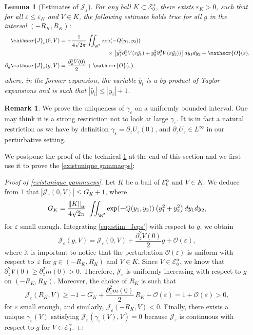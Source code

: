 \documentclass[JEP,XML,SOM,Unicode]{cedram}
\let\mathcal\mathscr
\newcommand{\cO}{\mathcal{O}}
\theoremstyle{plain}
\newtheorem{lem}[thm]{Lemma}
\theoremstyle{definition}
\newtheorem{remark}[thm]{Remark}
\newcommand{\Je}{\mathcal{J}_\eps}
\let\eps\varepsilon
\newcommand{\abs}[1]{\left\lvert#1\right\rvert}
\newcommand{\nalph}[1]{\left\lVert#1\right\rVert_\alpha}
\newcommand{\Eaz}{\mathcal{E}^\alpha_0}
\newcommand{\RK}{R_K}
\newcommand{\GK}{G_K}
\begin{document}
\begin{lem}[Estimates of $\Je$]\label{estimate Jeps}
For any ball $K \subset \Eaz$, there exists $\eps_K>0$, such that for all $\eps \leq \eps_K$ and $V \in K$, the following estimate holds true for all $g$ in the interval $(-\RK, \RK)$:
\begin{align}
\label{eq:estim_Jeps}
\Je(0,V) & = - \dfrac{1}{4 \sqrt{2}\pi} \iint _{\R^2} \exp(-Q (y_1,y_2))\\
&\hspace*{3cm}\times \left[ y_1^2 \partial_z^3 V(\eps \tilde{y_1}) + y_2^2 \partial_z^3 V(\eps \tilde{y_2})) \right] dy_1dy_2 + \cO(\eps),\notag \\
\label{eq:estim_Jeps'} \partial_g \Je(g,V)& =\dfrac{\partial^2_z V(0)}{2} + \cO(\eps),
\end{align}
where, in the former expansion, the variable $\tilde{y_i}$ is a by-product of Taylor expansions and is such that $\abs{\tilde{y_i}} \leq \abs{ y_i}+1$.
\end{lem}

\begin{remark}
We prove the uniqueness of $\gamma_\eps$ on a uniformly bounded interval. One may think it is a strong restriction not to look at large $\gamma_\eps$. It is in fact a natural restriction as we have by definition $\gamma_\eps = \partial_zU_\eps(0)$, and $\partial_z U_\eps \in L^\infty$ in our perturbative setting.
\end{remark}
We postpone the proof of the technical \cref{estimate Jeps} at the end of this section and we first use it to prove the \cref{existunique gammaeps}: \begin{proof}[Proof of \cref{existunique gammaeps}]
Let $K$ be a ball of $\Eaz$ and $V \in K$. We deduce from \cref{estimate Jeps} that $|\Je(0,V)| \leq \GK + 1$, where
\begin{equation*}
\GK = \dfrac{\nalph{K}}{4 \sqrt{2}\pi } \ \iint _{\R^2} \exp(-Q (y_1,y_2)) \left (y_1^2 + y_2^2 \right) dy_1dy_2,
\end{equation*}
for $\eps$ small enough. Integrating \eqref{eq:estim_Jeps'} with respect to $g$, we obtain
\begin{equation*}
\Je(g,V) = \Je(0,V) + \dfrac{\partial^2_z V(0)}{2} g + \cO(\eps),
\end{equation*}
where it is important to notice that the perturbation $\cO(\eps)$ is uniform with respect to~$\eps$ for $g\in (-\RK,\RK)$ and $V\in K$.
Since $V\in \Eaz$, we know that $\partial_z^2V(0)\geq \partial_z^2m(0)>0$. Therefore, $\Je$ is uniformly increasing with respect to $g$ on $(-\RK,\RK)$. Moreover, the choice of $\RK$ is such that
\begin{equation*}
\Je(\RK,V) \geq - 1 - \GK + \dfrac{\partial^2_z m(0)}{2}\, \RK + \cO(\eps) = 1 + \cO(\eps) >0,
\end{equation*}
for $\eps$ small enough, and similarly, $\Je(-\RK,V) < 0$. Finally, there exists a unique $\gamma_\eps(V)$ satisfying $\Je(\gamma_\eps(V),V)= 0$ because $\Je$ is continuous with respect to $g$ for $V\in \Eaz$.
\end{proof}
\end{document}
